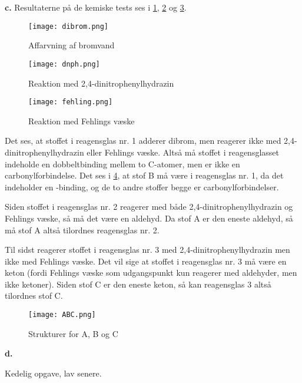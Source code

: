 \documentclass{report}
\begin{document}
\textbf{c.}
Resultaterne på de kemiske tests ses i \cref{fig:dibrom}, \cref{fig:dnph} og \cref{fig:fehling}.
\begin{multicols}{3}
\begin{figure}[H]
\begin{center}
  \texttt{[image: dibrom.png]}
\end{center}
\caption{Affarvning af bromvand}
\label{fig:dibrom}
\end{figure}
\begin{figure}[H]
\begin{center}
  \texttt{[image: dnph.png]}
\end{center}
\caption{Reaktion med 2,4-dinitrophenylhydrazin}
\label{fig:dnph}
\end{figure}
\begin{figure}[H]
\begin{center}
  \texttt{[image: fehling.png]}
\end{center}
\caption{Reaktion med Fehlings væske}
\label{fig:fehling}
\end{figure}
\end{multicols}
Det ses, at stoffet i reagensglas nr. 1 adderer dibrom, men reagerer ikke med 2,4-dinitrophenylhydrazin eller Fehlings væske.
Altså må stoffet i reagensglasset indeholde en dobbeltbinding mellem to C-atomer, men er ikke en carbonylforbindelse.
Det ses i \cref{fig:ABC}, at stof B må være i reagensglas nr. 1, da det indeholder en -binding, og de to andre stoffer begge er carbonylforbindelser.

Siden stoffet i reagensglas nr. 2 reagerer med både 2,4-dinitrophenylhydrazin og Fehlings væske, så må det være en aldehyd.
Da stof A er den eneste aldehyd, så må stof A altså tilordnes reagensglas nr. 2.

Til sidst reagerer stoffet i reagensglas nr. 3 med 2,4-dinitrophenylhydrazin men ikke med Fehlings væske.
Det vil sige at stoffet i reagensglas nr. 3 må være en keton (fordi Fehlings væske som udgangspunkt kun reagerer med aldehyder, men ikke ketoner).
Siden stof C er den eneste keton, så kan reagensglas 3 altså tilordnes stof C.
\begin{figure}[H]
\begin{center}
  \texttt{[image: ABC.png]}
\end{center}
\caption{Strukturer for A, B og C}
\label{fig:ABC}
\end{figure}
\textbf{d.}
\begin{note}
  Kedelig opgave, lav senere.
\end{note}
\end{document}
